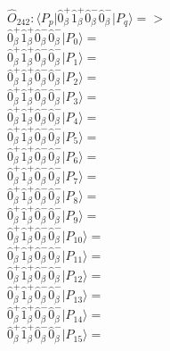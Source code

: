 \documentclass[14pt]{article}
\begin{document}
    $\hat{O}_{242}:  \langle{P_p}\vert \hat{0}_{\beta}^{+}\hat{1}_{\beta}^{+}\hat{0}_{\beta}^{-}\hat{0}_{\beta}^{-} \vert{P_q}\rangle => $ \\ 
    $ \hat{0}_{\beta}^{+}\hat{1}_{\beta}^{+}\hat{0}_{\beta}^{-}\hat{0}_{\beta}^{-} \vert{P_{0}}\rangle =  $ \\ 
    $ \hat{0}_{\beta}^{+}\hat{1}_{\beta}^{+}\hat{0}_{\beta}^{-}\hat{0}_{\beta}^{-} \vert{P_{1}}\rangle =  $ \\ 
    $ \hat{0}_{\beta}^{+}\hat{1}_{\beta}^{+}\hat{0}_{\beta}^{-}\hat{0}_{\beta}^{-} \vert{P_{2}}\rangle =  $ \\ 
    $ \hat{0}_{\beta}^{+}\hat{1}_{\beta}^{+}\hat{0}_{\beta}^{-}\hat{0}_{\beta}^{-} \vert{P_{3}}\rangle =  $ \\ 
    $ \hat{0}_{\beta}^{+}\hat{1}_{\beta}^{+}\hat{0}_{\beta}^{-}\hat{0}_{\beta}^{-} \vert{P_{4}}\rangle =  $ \\ 
    $ \hat{0}_{\beta}^{+}\hat{1}_{\beta}^{+}\hat{0}_{\beta}^{-}\hat{0}_{\beta}^{-} \vert{P_{5}}\rangle =  $ \\ 
    $ \hat{0}_{\beta}^{+}\hat{1}_{\beta}^{+}\hat{0}_{\beta}^{-}\hat{0}_{\beta}^{-} \vert{P_{6}}\rangle =  $ \\ 
    $ \hat{0}_{\beta}^{+}\hat{1}_{\beta}^{+}\hat{0}_{\beta}^{-}\hat{0}_{\beta}^{-} \vert{P_{7}}\rangle =  $ \\ 
    $ \hat{0}_{\beta}^{+}\hat{1}_{\beta}^{+}\hat{0}_{\beta}^{-}\hat{0}_{\beta}^{-} \vert{P_{8}}\rangle =  $ \\ 
    $ \hat{0}_{\beta}^{+}\hat{1}_{\beta}^{+}\hat{0}_{\beta}^{-}\hat{0}_{\beta}^{-} \vert{P_{9}}\rangle =  $ \\ 
    $ \hat{0}_{\beta}^{+}\hat{1}_{\beta}^{+}\hat{0}_{\beta}^{-}\hat{0}_{\beta}^{-} \vert{P_{10}}\rangle =  $ \\ 
    $ \hat{0}_{\beta}^{+}\hat{1}_{\beta}^{+}\hat{0}_{\beta}^{-}\hat{0}_{\beta}^{-} \vert{P_{11}}\rangle =  $ \\ 
    $ \hat{0}_{\beta}^{+}\hat{1}_{\beta}^{+}\hat{0}_{\beta}^{-}\hat{0}_{\beta}^{-} \vert{P_{12}}\rangle =  $ \\ 
    $ \hat{0}_{\beta}^{+}\hat{1}_{\beta}^{+}\hat{0}_{\beta}^{-}\hat{0}_{\beta}^{-} \vert{P_{13}}\rangle =  $ \\ 
    $ \hat{0}_{\beta}^{+}\hat{1}_{\beta}^{+}\hat{0}_{\beta}^{-}\hat{0}_{\beta}^{-} \vert{P_{14}}\rangle =  $ \\ 
    $ \hat{0}_{\beta}^{+}\hat{1}_{\beta}^{+}\hat{0}_{\beta}^{-}\hat{0}_{\beta}^{-} \vert{P_{15}}\rangle =  $ \\ 
    
\end{document}
